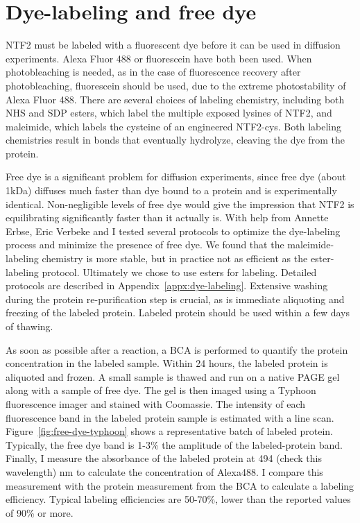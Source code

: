 \section{Dye-labeling and free dye}
\label{sec:free-dye}

NTF2 must be labeled with a fluorescent dye before it can be used in diffusion experiments.  Alexa Fluor 488 or fluorescein have both been used.  When photobleaching is needed, as in the case of fluorescence recovery after photobleaching, fluorescein should be used, due to the extreme photostability of Alexa Fluor 488.  There are several choices of labeling chemistry, including both NHS and SDP esters, which label the multiple exposed lysines of NTF2, and maleimide, which labels the cysteine of an engineered NTF2-cys.  Both labeling chemistries result in bonds that eventually hydrolyze, cleaving the dye from the protein. 

Free dye is a significant problem for diffusion experiments, since free dye (about 1kDa) diffuses much faster than dye bound to a protein and is experimentally identical.  Non-negligible levels of free dye would give the impression that NTF2 is equilibrating significantly faster than it actually is.  With help from Annette Erbse, Eric Verbeke and I tested several protocols to optimize the dye-labeling process and minimize the presence of free dye.  We found that the maleimide-labeling chemistry is more stable, but in practice not as efficient as the ester-labeling protocol.  Ultimately we chose to use esters for labeling.  Detailed protocols are described in Appendix~\ref{appx:dye-labeling}.  Extensive washing during the protein re-purification step is crucial, as is immediate aliquoting and freezing of the labeled protein.  Labeled protein should be used within a few days of thawing.

As soon as possible after a reaction, a BCA is performed to quantify the protein concentration in the labeled sample.  Within 24 hours, the labeled protein is aliquoted and frozen.  A small sample is thawed and run on a native PAGE gel along with a sample of free dye.  The gel is then imaged using a Typhoon fluorescence imager and stained with Coomassie.  The intensity of each fluorescence band in the labeled protein sample is estimated with a line scan.  Figure~\ref{fig:free-dye-typhoon} shows a representative batch of labeled protein.  Typically, the free dye band is 1-3\% the amplitude of the labeled-protein band.  Finally, I measure the absorbance of the labeled protein at 494 (check this wavelength) nm to calculate the concentration of Alexa488.  I compare this measurement with the protein measurement from the BCA to calculate a labeling efficiency.  Typical labeling efficiencies are 50-70\%, lower than the reported values of 90\% or more.

